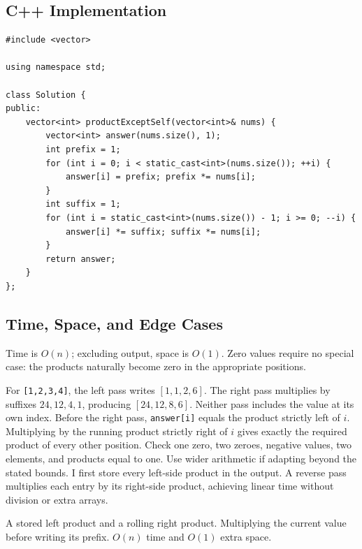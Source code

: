 \subsection{C++ Implementation}
\begin{lstlisting}[style=compactcode,caption={Complete C++ solution: Product of Array Except Self}]
#include <vector>

using namespace std;

class Solution {
public:
    vector<int> productExceptSelf(vector<int>& nums) {
        vector<int> answer(nums.size(), 1);
        int prefix = 1;
        for (int i = 0; i < static_cast<int>(nums.size()); ++i) {
            answer[i] = prefix; prefix *= nums[i];
        }
        int suffix = 1;
        for (int i = static_cast<int>(nums.size()) - 1; i >= 0; --i) {
            answer[i] *= suffix; suffix *= nums[i];
        }
        return answer;
    }
};
\end{lstlisting}

\subsection{Time, Space, and Edge Cases}
Time is \(O(n)\); excluding output, space is \(O(1)\). Zero values require no
special case: the products naturally become zero in the appropriate positions.

\lessonexpansion
  {For \texttt{[1,2,3,4]}, the left pass writes \([1,1,2,6]\). The right
   pass multiplies by suffixes \(24,12,4,1\), producing
   \([24,12,8,6]\). Neither pass includes the value at its own index.}
  {Before the right pass, \texttt{answer[i]} equals the product strictly left
   of \(i\). Multiplying by the running product strictly right of \(i\) gives
   exactly the required product of every other position.}
  {Check one zero, two zeroes, negative values, two elements, and products
   equal to one. Use wider arithmetic if adapting beyond the stated bounds.}
  {I first store every left-side product in the output. A reverse pass
   multiplies each entry by its right-side product, achieving linear time
   without division or extra arrays.}

  {A stored left product and a rolling right product.}
  {Multiplying the current value before writing its prefix.}
  {$O(n)$ time and $O(1)$ extra space.}



